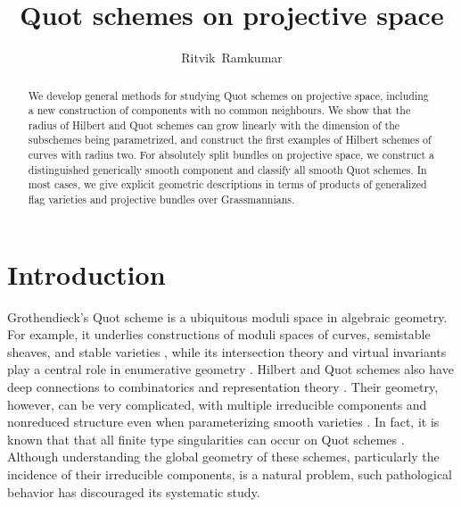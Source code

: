 \documentclass[leqno,11pt,a4paper]{amsart}
\theoremstyle{definition}
\numberwithin{equation}{section}
\begin{document}
\author[R.\,Ramkumar]{Ritvik~Ramkumar}
\address{Department of Mathematics\\University of Notre Dame\\South Bend, IN\\USA}
\title{Quot schemes on projective space}
\maketitle
\begin{abstract}
We develop general methods for studying Quot schemes on projective space, including a new construction of components with no common neighbours.
We show that the radius of Hilbert and Quot schemes can grow linearly with the dimension of the subschemes being parametrized, and construct the first examples of Hilbert schemes of curves with radius two. 
For absolutely split bundles on projective space, we construct a distinguished generically smooth component and classify all smooth Quot schemes. 
In most cases, we give explicit geometric descriptions in terms of products of generalized flag varieties and projective bundles over Grassmannians.
\end{abstract}


\section{Introduction}
Grothendieck's Quot scheme \cite{Grothendieck__construction_Hilb} is a ubiquitous moduli space in algebraic geometry. 
For example, it underlies constructions of moduli spaces of curves, semistable sheaves, and stable varieties \cite{Gieseker_ModuliCurves,HL,Kollar_Families}, while its
intersection theory and virtual invariants play a central role in enumerative geometry \cite{MarianOprea2007,MNOP}.
Hilbert and Quot schemes also have deep connections to combinatorics and representation theory \cite{Haiman_macdonald,Nakajima1997}.
Their geometry, however, can be very complicated, with multiple irreducible components and nonreduced structure even when parameterizing smooth varieties \cite{Mumford_nonreduced_component}. 
In fact, it is known that that all finite type singularities can occur on Quot schemes \cite{Vakil_MurphyLaw,Jelisiejew__Pathologies}.
Although understanding the global geometry of these schemes, particularly the incidence of their irreducible components, is a natural problem, such pathological behavior has discouraged its systematic study.
\end{document}

